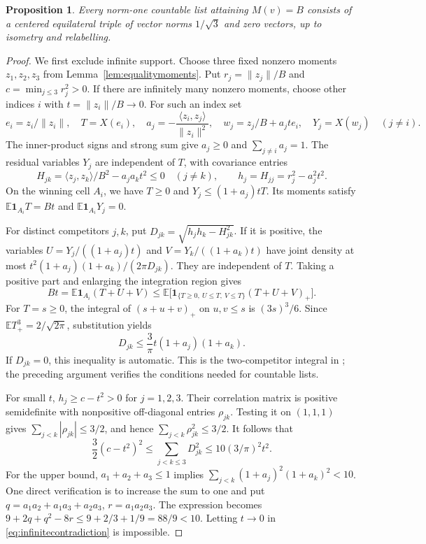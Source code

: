 \documentclass[11pt,reqno]{amsart}
\numberwithin{equation}{section}
\newtheorem{proposition}[theorem]{Proposition}
\theoremstyle{definition}
\theoremstyle{remark}
\newcommand{\E}{\mathbb E}
\begin{document}
\begin{proposition}\label{prop:equality}
Every norm-one countable list attaining $M(v)=B$ consists of a
centered equilateral triple of vector norms $1/\sqrt3$ and zero
vectors, up to isometry and relabelling.
\end{proposition}
\begin{proof}
We first exclude infinite support. Choose three fixed nonzero moments
$z_1,z_2,z_3$ from Lemma~\ref{lem:equalitymoments}. Put
$r_j=\|z_j\|/B$ and $c=\min_{j\le3}r_j^2>0$.
If there are infinitely many nonzero moments, choose other indices $i$
with $t=\|z_i\|/B\to0$. For such an index set
\[
 e_i=z_i/\|z_i\|,\quad T=X(e_i),\quad
 a_j=-\frac{\langle z_i,z_j\rangle}{\|z_i\|^2},\quad
 w_j=z_j/B+a_jt e_i,\quad Y_j=X(w_j)\quad(j\ne i).
\]
The inner-product signs and strong sum give $a_j\ge0$ and
$\sum_{j\ne i}a_j=1$. The residual variables $Y_j$ are independent
of $T$, with covariance entries
\[
 H_{jk}=\langle z_j,z_k\rangle/B^2-a_ja_kt^2\le0\quad(j\ne k),
 \qquad h_j=H_{jj}=r_j^2-a_j^2t^2.
\]
On the winning cell $A_i$, we have $T\ge0$ and
$Y_j\le(1+a_j)tT$. Its moments satisfy
$\E\mathbf1_{A_i}T=Bt$ and $\E\mathbf1_{A_i}Y_j=0$.

For distinct competitors $j,k$, put
$D_{jk}=\sqrt{h_jh_k-H_{jk}^2}$. If it is positive, the variables
$U=Y_j/((1+a_j)t)$ and $V=Y_k/((1+a_k)t)$ have joint density at most
$t^2(1+a_j)(1+a_k)/(2\pi D_{jk})$. They are independent of $T$.
Taking a positive part and enlarging the integration region gives
\[
 Bt=\E\mathbf1_{A_i}(T+U+V)
       \le\E\bigl[\mathbf1_{\{T\ge0,\ U\le T,\ V\le T\}}
                                     (T+U+V)_+\bigr].
\]
For $T=s\ge0$, the integral of $(s+u+v)_+$ on $u,v\le s$ is
$(3s)^3/6$. Since $\E T_+^3=2/\sqrt{2\pi}$, substitution yields
\begin{equation}\label{eq:pair}
                         D_{jk}\le\frac3\pi t(1+a_j)(1+a_k).
\end{equation}
If $D_{jk}=0$, this inequality is automatic. This is the
two-competitor integral in \cite[Section 4]{OpenAI}; the preceding
argument verifies the conditions needed for countable lists.

For small $t$, $h_j\ge c-t^2>0$ for $j=1,2,3$. Their correlation
matrix is positive semidefinite with nonpositive off-diagonal entries
$\rho_{jk}$. Testing it on $(1,1,1)$ gives
$\sum_{j<k}|\rho_{jk}|\le3/2$, and hence
$\sum_{j<k}\rho_{jk}^2\le3/2$. It follows that
\begin{equation}\label{eq:infinitecontradiction}
 \frac32(c-t^2)^2\le\sum_{j<k\le3}D_{jk}^2
             \le10(3/\pi)^2t^2.
\end{equation}
For the upper bound, $a_1+a_2+a_3\le1$ implies
$\sum_{j<k}(1+a_j)^2(1+a_k)^2<10$. One direct verification is
to increase the sum to one and put
$q=a_1a_2+a_1a_3+a_2a_3$, $r=a_1a_2a_3$. The expression becomes
$9+2q+q^2-8r\le9+2/3+1/9=88/9<10$.
Letting $t\to0$ in \eqref{eq:infinitecontradiction} is impossible.


\end{proof}
\end{document}
